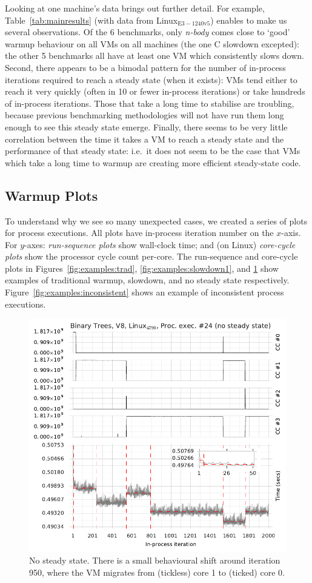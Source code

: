 \documentclass[acmlarge]{acmart}\settopmatter{printfolios=true}
\newcommand{\nbody}{\emph{n-body}\xspace}
\newcommand{\bencherseven}{Linux$_\mathrm{E3-1240v5}$\xspace}
\begin{document}
Looking at one machine's data brings out further detail. For
example, Table~\ref{tab:mainresults} (with data from \bencherseven)
enables to make us several observations. Of the 6 benchmarks, only \nbody comes
close to `good' warmup behaviour on all
VMs on all machines (the one C slowdown excepted): the other 5 benchmarks all have at least one VM which consistently
slows down. Second, there appears to be a bimodal pattern for the number
of in-process iterations required to reach a steady state (when it exists): VMs
tend either to reach it very quickly (often in 10 or fewer in-process iterations)
or take hundreds of in-process iterations. Those that take a long time
to stabilise are troubling, because previous benchmarking methodologies
will not have run them long enough to see this steady state emerge.
Finally, there seems to be very little
correlation between the time it takes a VM to reach a steady state and the
performance of that steady state: i.e.~it does not seem to be the case that VMs
which take a long time to warmup are creating more efficient
steady-state code.


\subsection{Warmup Plots}

To understand why we see so many unexpected cases, we created a series of plots
for process executions. All
plots have in-process iteration number on the $x$-axis. For $y$-axes:
\emph{run-sequence plots} show wall-clock time; and (on Linux) \emph{core-cycle plots} show
the processor cycle count per-core.
The run-sequence and core-cycle plots in Figures~\ref{fig:examples:trad}, \ref{fig:examples:slowdown1},
and \ref{fig:examples:nosteadystate} show examples of traditional warmup, slowdown,
and no steady state respectively. Figure~\ref{fig:examples:inconsistent} shows
an example of inconsistent process executions.

\begin{figure}[t]
\centering
\includegraphics[width=.49\textwidth]{examples/new_no_steady.pdf}
\caption{No steady state. There is a small behavioural shift around iteration
950, where the VM migrates from (tickless) core 1 to (ticked) core 0.}
\label{fig:examples:nosteadystate}
\end{figure}
\end{document}
